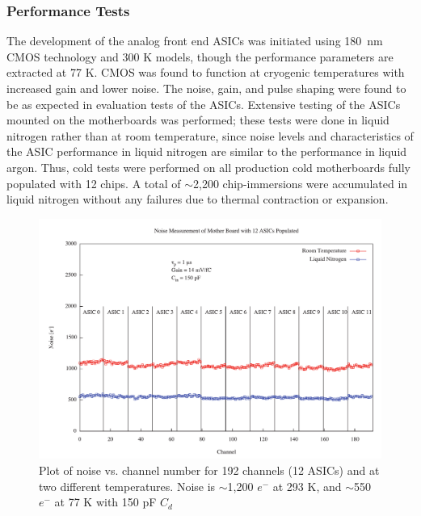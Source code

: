 \subsubsection{Performance Tests}

The development of the analog front end ASICs was initiated using 180~nm CMOS technology and 300 K models, though the performance parameters are extracted at 77 K. CMOS was found to function at cryogenic temperatures with increased gain and lower noise. The noise, gain, and pulse shaping were found to be as expected in evaluation tests of the ASICs. Extensive testing of the ASICs mounted on the motherboards was performed; these tests were done in liquid nitrogen rather than at room temperature, since noise levels and characteristics of the ASIC performance in liquid nitrogen are similar to the performance in liquid argon.  Thus, cold tests were performed on all production cold motherboards fully populated with 12 chips. A total of $\sim$2,200 chip-immersions were accumulated in liquid nitrogen without any failures due to thermal contraction or expansion. 

\begin{figure}
\begin{center}
\includegraphics[scale=0.4]{figures/noise.pdf}
\end{center}
\caption{\label{fig:fignoise}Plot of noise vs. channel number for 192 channels (12 ASICs) and at two different temperatures. Noise is $\sim$1,200 $e^{-}$ at 293 K, and $\sim$550 $e^{-}$ at 77 K with 150 pF $C_{d}$}
\end{figure}

